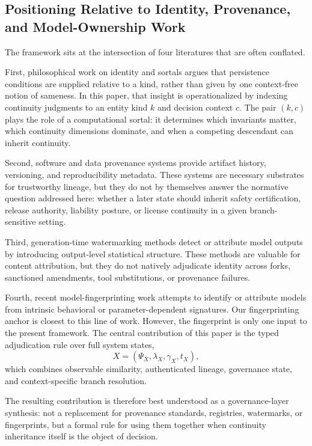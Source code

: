 \documentclass[11pt,a4paper]{article}
\begin{document}
\subsection{Positioning Relative to Identity, Provenance, and Model-Ownership Work}

The framework sits at the intersection of four literatures that are often conflated.

First, philosophical work on identity and sortals argues that persistence conditions are supplied relative to a kind, rather than given by one context-free notion of sameness. In this paper, that insight is operationalized by indexing continuity judgments to an entity kind \(k\) and decision context \(c\). The pair \((k,c)\) plays the role of a computational sortal: it determines which invariants matter, which continuity dimensions dominate, and when a competing descendant can inherit continuity.

Second, software and data provenance systems provide artifact history, versioning, and reproducibility metadata. These systems are necessary substrates for trustworthy lineage, but they do not by themselves answer the normative question addressed here: whether a later state should inherit safety certification, release authority, liability posture, or license continuity in a given branch-sensitive setting.

Third, generation-time watermarking methods detect or attribute model outputs by introducing output-level statistical structure. These methods are valuable for content attribution, but they do not natively adjudicate identity across forks, sanctioned amendments, tool substitutions, or provenance failures.

Fourth, recent model-fingerprinting work attempts to identify or attribute models from intrinsic behavioral or parameter-dependent signatures. Our fingerprinting anchor is closest to this line of work. However, the fingerprint is only one input to the present framework. The central contribution of this paper is the typed adjudication rule over full system states,
\[
X = (\Psi_X,\lambda_X,\gamma_X,t_X),
\]
which combines observable similarity, authenticated lineage, governance state, and context-specific branch resolution.

The resulting contribution is therefore best understood as a governance-layer synthesis: not a replacement for provenance standards, registries, watermarks, or fingerprints, but a formal rule for using them together when continuity inheritance itself is the object of decision.
\end{document}

